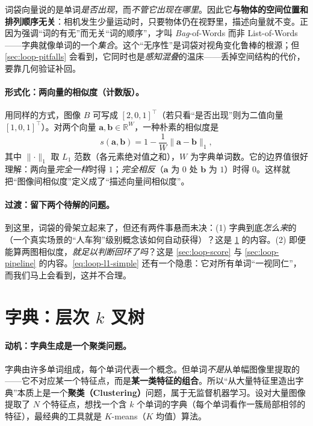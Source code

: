 \begin{insight}\label{ins:loop-bag}
词袋向量说的是单词\emph{是否出现}，而\emph{不管它出现在哪里}\cite{gaoxiang2019slam14}。因此它\textbf{与物体的空间位置和排列顺序无关}：相机发生少量运动时，只要物体仍在视野里，描述向量就不变。正因为强调“词的有无”而无关“词的顺序”，才叫 \emph{Bag}-of-Words 而非 List-of-Words——字典就像单词的一个\emph{集合}。这个“无序性”是词袋对视角变化鲁棒的根源；但 \cref{sec:loop-pitfalls} 会看到，它同时也是\emph{感知混叠}的温床——丢掉空间结构的代价，要靠几何验证补回。
\end{insight}

\paragraph{形式化：两向量的相似度（计数版）。}
用同样的方式，图像 $B$ 可写成 $[2,0,1]^{\top}$（若只看“是否出现”则为二值向量 $[1,0,1]^{\top}$）。对两个向量 $\boldsymbol a,\boldsymbol b\in\mathbb{R}^{W}$，一种朴素的相似度是
\begin{equation}
  s(\boldsymbol a,\boldsymbol b)=1-\frac{1}{W}\lVert\boldsymbol a-\boldsymbol b\rVert_1,
  \label{eq:loop-l1-simple}
\end{equation}
其中 $\lVert\cdot\rVert_1$ 取 $L_1$ 范数（各元素绝对值之和），$W$ 为字典单词数。它的边界值很好理解\cite{gaoxiang2019slam14}：两向量\emph{完全一样}时得 $1$；\emph{完全相反}（$\boldsymbol a$ 为 $0$ 处 $\boldsymbol b$ 为 $1$）时得 $0$。这样就把“图像间相似度”定义成了“描述向量间相似度”。

\paragraph{过渡：留下两个待解的问题。}
到这里，词袋的骨架立起来了，但还有两件事悬而未决\cite{gaoxiang2019slam14}：(1) 字典到底\emph{怎么来}的（一个真实场景的“人车狗”级别概念该如何自动获得）？这是 \cref{sec:loop-dict} 的内容。(2) 即便能算两图相似度，\emph{就足以判断回环了吗}？这是 \cref{sec:loop-score} 与 \cref{sec:loop-pipeline} 的内容。\cref{eq:loop-l1-simple} 还有一个隐患：它对所有单词“一视同仁”，而我们马上会看到，这并不合理。

\section{字典：层次 \texorpdfstring{$k$}{k} 叉树}
\label{sec:loop-dict}

\paragraph{动机：字典生成是一个聚类问题。}
字典由许多单词组成，每个单词代表一个概念。但单词\emph{不是}从单幅图像里提取的——它不对应某一个特征点，而是\textbf{某一类特征的组合}\cite{gaoxiang2019slam14}。所以“从大量特征里造出字典”本质上是一个\textbf{聚类（Clustering）}问题，属于无监督机器学习。设对大量图像提取了 $N$ 个特征点，想找一个含 $k$ 个单词的字典（每个单词看作一簇局部相邻的特征），最经典的工具就是 $K$-means（$K$ 均值）算法。

